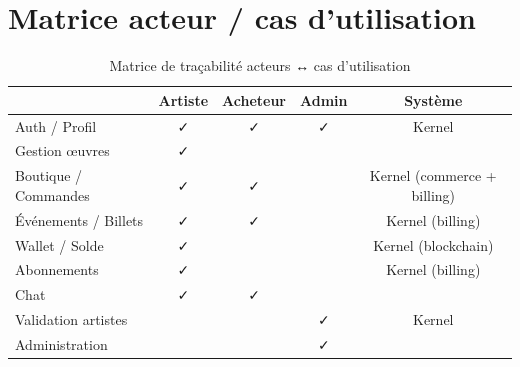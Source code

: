 \section{Matrice acteur / cas d'utilisation}

\begin{table}[h]
  \centering
  \caption{Matrice de traçabilité acteurs ↔ cas d'utilisation}
  \label{tab:uc-matrix}
  \small
  \begin{tabular}{@{}lcccc@{}}
    \toprule
    & \textbf{Artiste} & \textbf{Acheteur} & \textbf{Admin} & \textbf{Système} \\
    \midrule
    Auth / Profil        & ✓ & ✓ & ✓ & Kernel \\
    Gestion œuvres         & ✓ &   &   &     \\
    Boutique / Commandes   & ✓ & ✓ &   & Kernel (commerce + billing) \\
    Événements / Billets   & ✓ & ✓ &   & Kernel (billing) \\
    Wallet / Solde         & ✓ &   &   & Kernel (blockchain) \\
    Abonnements            & ✓ &   &   & Kernel (billing) \\
    Chat                   & ✓ & ✓ &   &     \\
    Validation artistes    &   &   & ✓ & Kernel \\
    Administration         &   &   & ✓ &     \\
    \bottomrule
  \end{tabular}
\end{table}
